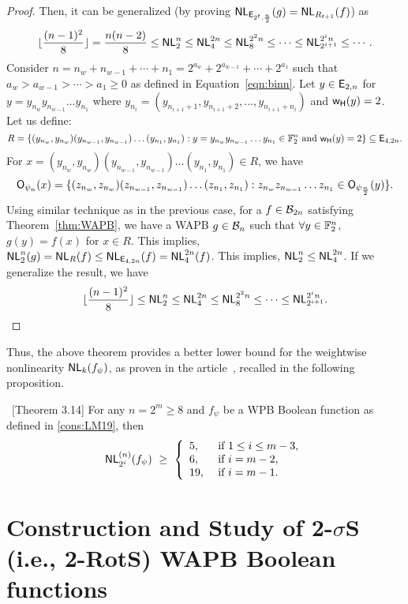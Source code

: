 \documentclass{llncs}
\begin{document}
\begin{proof}
Then, it can be generalized (by proving $\mathsf{NL}_{\mathsf{E}_{2^t,\frac{n}{2}}}(g) = \mathsf{NL}_{R_{t+1}}(f)$) as
$$\lfloor\frac{(n-1)^2}{8}\rfloor = \frac{n(n-2)}{8} \leq \mathsf{NL}_{2}^n \leq \mathsf{NL}_{4}^{2n} \leq \mathsf{NL}_{8}^{2^{2}n } \leq \cdots \leq \mathsf{NL}_{2^{i+1}}^{2^{i}n} \leq \cdots.$$ 
Consider $n = n_w + n _{w-1} + \cdots + n_1 = 2^{a_w} + 2^{a_{w-1}} + \cdots + 2^{a_1}$ such that $ a_w > a_{w-1} > \cdots > a_1 \geq 0$ as defined in Equation~\ref{eqn:binn}. Let $y \in \mathsf{E}_{2,n}$ for  $y = y_{n_w} y_{n_{w-1}} \ldots y_{n_1}$ where $y_{n_i} = (y_{n_{i+1}+1},y_{n_{i+1}+2},\ldots , y_{n_{i+1}+n_i})$ and $\mathsf{w_H}(y)=2$. 
Let us define:
$$R =\{(y_{n_w},y_{n_w})(y_{n_{w-1}},y_{n_{w-1}})\ldots (y_{n_1},y_{n_1}) : y = y_{n_w} y_{n_{w-1}} \ldots y_{n_1} \in \mathbb{F}_2^{n} \text{ and } \mathsf{w_H}(y) = 2 \} \subseteq \mathsf{E}_{4,2n}.$$ 
For $x =  (y_{n_w},y_{n_w})(y_{n_{w-1}},y_{n_{w-1}})\ldots (y_{n_1},y_{n_1}) \in R $, we have
$$\mathsf{O}_{\psi_n}(x) = \{(z_{n_w}, z_{n_w})(z_{n_{w-1}},z_{n_{w-1}})\ldots (z_{n_1},z_{n_1}) : z_{n_w} z_{n_{w-1}} \ldots z_{n_1} \in \mathsf{O}_{\psi_\frac{n}{2}}(y)\}.$$
Using similar technique as in the previous case, for a $ f \in \mathcal{B}_{2n}$ satisfying Theorem~\ref{thm:WAPB}, we have a WAPB $g \in \mathcal{B}_{n}$  such that $\forall y \in \mathbb{F}_2^{n}$,  $g(y) = f(x)$ for $ x \in R$. This implies, $\mathsf{NL}_{2}^{n}(g) = \mathsf{NL}_{R}(f) \leq \mathsf{NL}_{\mathsf{E}_{4,2n}}(f) = \mathsf{NL}_{4}^{2n}(f)$. This implies, $\mathsf{NL}_{2}^{n} \leq \mathsf{NL}_{4}^{2n}$.
If we generalize the result, we have
$$ \lfloor\frac{(n-1)^2}{8}\rfloor \leq \mathsf{NL}_{2}^n \leq \mathsf{NL}_{4}^{2n} \leq \mathsf{NL}_{8}^{2^{2}n } \leq \cdots \leq \mathsf{NL}_{2^{i+1}}^{2^{i}n}.$$
\end{proof}
Thus, the above theorem provides a better lower bound for the weightwise nonlinearity $\mathsf{NL}_{k}(f_\psi)$, as proven in the article~\cite{DCC:LiuMes19}, recalled in the following proposition.
\begin{proposition}~\cite{DCC:LiuMes19}[Theorem 3.14]
For any $n = 2^m \geq 8$ and $f_\psi$ be a WPB Boolean function as defined in \ref{cons:LM19}, then $$\mathsf{NL}_{2^i}^{(n)}(f_\psi) ~\geq ~ \left \{ 
\begin{array}{ll}
5,  &  \text{ if } 1 \leq i \leq m-3, \\
6,  &  \text{ if } i = m-2, \\
19, &  \text{ if } i = m-1.
\end{array} \right. $$	
\end{proposition}

\section{Construction and Study of 2-$\sigma$S (i.e., 2-RotS) WAPB Boolean functions}\label{sec:2RotS}
\end{document}
